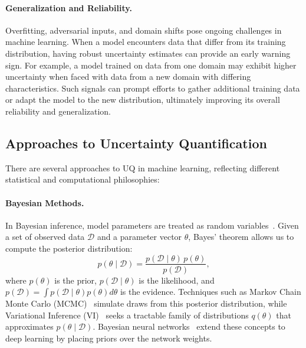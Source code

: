\paragraph{Generalization and Reliability.} Overfitting, adversarial inputs, and domain shifts pose ongoing challenges in machine learning. When a model encounters data that differ from its training distribution, having robust uncertainty estimates can provide an early warning sign. For example, a model trained on data from one domain may exhibit higher uncertainty when faced with data from a new domain with differing characteristics. Such signals can prompt efforts to gather additional training data or adapt the model to the new distribution, ultimately improving its overall reliability and generalization.

\subsection{Approaches to Uncertainty Quantification}
There are several approaches to UQ in machine learning, reflecting different statistical and computational philosophies:

\paragraph{Bayesian Methods.}
In Bayesian inference, model parameters are treated as random variables~\citep{bishop2006pattern}. Given a set of observed data $\mathcal{D}$ and a parameter vector $\theta$, Bayes' theorem allows us to compute the posterior distribution:
\begin{equation}
p(\theta \mid \mathcal{D}) = \frac{p(\mathcal{D} \mid \theta) \, p(\theta)}{p(\mathcal{D})},
\end{equation}
where $p(\theta)$ is the prior, $p(\mathcal{D} \mid \theta)$ is the likelihood, and $p(\mathcal{D}) = \int p(\mathcal{D} \mid \theta)p(\theta)d\theta$ is the evidence. Techniques such as Markov Chain Monte Carlo (MCMC)~\citep{geyer1992practical} simulate draws from this posterior distribution, while Variational Inference (VI)~\citep{blei2017variational} seeks a tractable family of distributions $q(\theta)$ that approximates $p(\theta \mid \mathcal{D})$. Bayesian neural networks~\citep{blundell2015weight} extend these concepts to deep learning by placing priors over the network weights.


